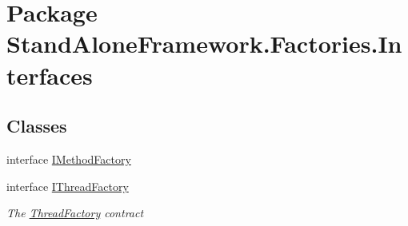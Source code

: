 \hypertarget{namespace_stand_alone_framework_1_1_factories_1_1_interfaces}{\section{Package Stand\+Alone\+Framework.\+Factories.\+Interfaces}
\label{namespace_stand_alone_framework_1_1_factories_1_1_interfaces}
}
\subsection*{Classes}
\begin{DoxyCompactItemize}
\item 
interface \hyperlink{interface_stand_alone_framework_1_1_factories_1_1_interfaces_1_1_i_method_factory}{I\+Method\+Factory}
\item 
interface \hyperlink{interface_stand_alone_framework_1_1_factories_1_1_interfaces_1_1_i_thread_factory}{I\+Thread\+Factory}
\begin{DoxyCompactList}\small\item\em The \hyperlink{namespace_stand_alone_framework_1_1_factories_1_1_thread_factory}{Thread\+Factory} contract \end{DoxyCompactList}\end{DoxyCompactItemize}
